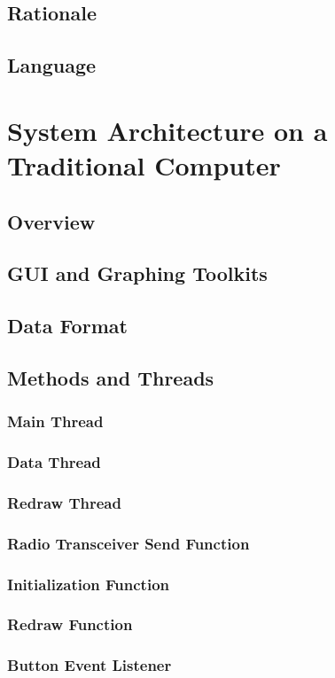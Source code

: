 \documentclass[10pt,draftclsnofoot,onecolumn,compsoc]{IEEEtran}
\begin{document}
\subsection{Rationale}
\subsection{Language}
\section{System Architecture on a Traditional Computer }
\subsection{Overview}
\subsection{GUI and Graphing Toolkits}
\subsection{Data Format}
\subsection{Methods and Threads}
\subsubsection{Main Thread}
\subsubsection{Data Thread}
\subsubsection{Redraw Thread}
\subsubsection{Radio Transceiver Send Function}
\subsubsection{Initialization Function}
\subsubsection{Redraw Function}
\subsubsection{Button Event Listener}
\end{document}

